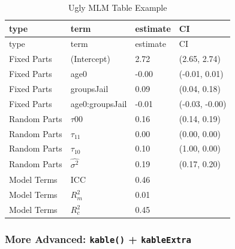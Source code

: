 \documentclass[]{article}
\newenvironment{Shaded}{\begin{snugshade}}{\end{snugshade}}
\newcommand{\KeywordTok}[1]{\textcolor[rgb]{0.13,0.29,0.53}{\textbf{#1}}}
\newcommand{\DataTypeTok}[1]{\textcolor[rgb]{0.13,0.29,0.53}{#1}}
\newcommand{\DecValTok}[1]{\textcolor[rgb]{0.00,0.00,0.81}{#1}}
\newcommand{\StringTok}[1]{\textcolor[rgb]{0.31,0.60,0.02}{#1}}
\newcommand{\CommentTok}[1]{\textcolor[rgb]{0.56,0.35,0.01}{\textit{#1}}}
\newcommand{\OperatorTok}[1]{\textcolor[rgb]{0.81,0.36,0.00}{\textbf{#1}}}
\newcommand{\NormalTok}[1]{#1}
\begin{document}
\begin{longtable}[]{@{}llll@{}}
\caption{Ugly MLM Table Example}\tabularnewline
\toprule
type & term & estimate & CI\tabularnewline
\midrule
\endfirsthead
\toprule
type & term & estimate & CI\tabularnewline
\midrule
\endhead
Fixed Parts & (Intercept) & 2.72 & (2.65, 2.74)\tabularnewline
Fixed Parts & age0 & -0.00 & (-0.01, 0.01)\tabularnewline
Fixed Parts & groupsJail & 0.09 & (0.04, 0.18)\tabularnewline
Fixed Parts & age0:groupsJail & -0.01 & (-0.03, -0.00)\tabularnewline
Random Parts & \(\tau{00}\) & 0.16 & (0.14, 0.19)\tabularnewline
Random Parts & \(\tau_{11}\) & 0.00 & (0.00, 0.00)\tabularnewline
Random Parts & \(\tau_{10}\) & 0.10 & (1.00, 0.00)\tabularnewline
Random Parts & \(\hat{\sigma^2}\) & 0.19 & (0.17, 0.20)\tabularnewline
Model Terms & ICC & 0.46 &\tabularnewline
Model Terms & \(R^2_m\) & 0.01 &\tabularnewline
Model Terms & \(R^2_c\) & 0.45 &\tabularnewline
\bottomrule
\end{longtable}

\subsubsection{\texorpdfstring{More Advanced: \texttt{kable()} +
\texttt{kableExtra}}{More Advanced: kable() + kableExtra}}\label{more-advanced-kable-kableextra}

\small

\begin{Shaded}
\end{Shaded}
\end{document}
